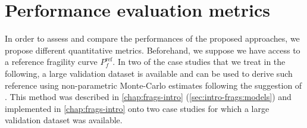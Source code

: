 







\section{Performance evaluation metrics}\label{sec:PREM:metrics}

In order to assess and compare the performances of the proposed approaches, we propose different quantitative metrics.
Beforehand, we suppose we have access to a reference fragility curve $P^{\text{ref}}_f$. In two of the case studies that we treat in the following, a large validation dataset is available and can be used to derive such reference using non-parametric Monte-Carlo estimates following the suggestion of \citet{trevlopoulos_parametric_2019}. This method was described in   \cref{chap:frags-intro} (\cref{sec:intro-frags:models}) and implemented in   \cref{chap:frags-intro} onto two case studies for which a large validation dataset was available.

